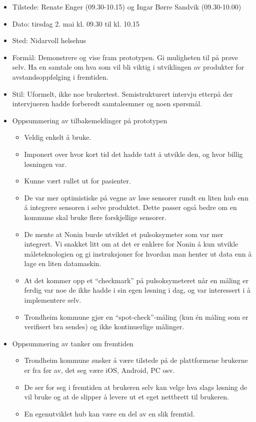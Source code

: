 \begin{itemize}
\tightlist
\item
  Tilstede: Renate Enger (09.30-10.15) og Ingar Børre Sandvik
  (09.30-10.00)
\item
  Dato: tirsdag 2. mai kl. 09.30 til kl. 10.15
\item
  Sted: Nidarvoll helsehus
\item
  Formål: Demonstrere og vise fram prototypen. Gi muligheten til på
  prøve selv. Ha en samtale om hva som vil bli viktig i utviklingen av
  produkter for avstandsoppfølging i fremtiden.
\item
  Stil: Uformelt, ikke noe brukertest. Semistrukturert intervju etterpå
  der intervjueren hadde forberedt samtaleemner og noen spørsmål.
\item
  Oppsummering av tilbakemeldinger på prototypen

  \begin{itemize}
  \tightlist
  \item
    Veldig enkelt å bruke.
  \item
    Imponert over hvor kort tid det hadde tatt å utvikle den, og hvor
    billig løsningen var.
  \item
    Kunne vært rullet ut for pasienter.
  \item
    De var mer optimistiske på vegne av løse sensorer rundt en liten hub
    enn å integrere sensoren i selve produktet. Dette passer også bedre
    om en kommune skal bruke flere forskjellige sensorer.
  \item
    De mente at Nonin burde utviklet et pulsoksymeter som var mer
    integrert. Vi snakket litt om at det er enklere for Nonin å kun
    utvikle måleteknologien og gi instruksjoner for hvordan man henter
    ut data enn å lage en liten datamaskin.
  \item
    At det kommer opp et ``checkmark'' på pulsoksymeteret når en måling
    er ferdig var noe de ikke hadde i sin egen løsning i dag, og var
    interessert i å implementere selv.
  \item
    Trondheim kommune gjør en ``spot-check''-måling (kun én måling som
    er verifisert bra sendes) og ikke kontinuerlige målinger.
  \end{itemize}
\item
  Oppsummering av tanker om fremtiden

  \begin{itemize}
  \tightlist
  \item
    Trondheim kommune ønsker å være tilstede på de plattformene brukerne
    er fra før av, det seg være iOS, Android, PC osv.
  \item
    De ser for seg i fremtiden at brukeren selv kan velge hva slags
    løsning de vil bruke og at de slipper å levere ut et eget nettbrett
    til brukeren.
  \item
    En egenutviklet hub kan være en del av en slik fremtid.
  \end{itemize}
\end{itemize}

